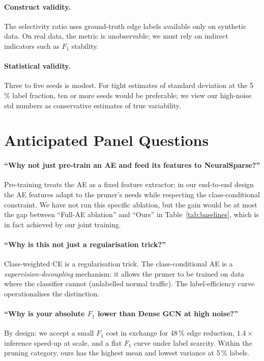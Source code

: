 \documentclass[11pt,a4paper]{report}
\theoremstyle{definition}
\theoremstyle{remark}
\begin{document}
\paragraph{Construct validity.}
The selectivity ratio uses ground-truth edge labels available only on
synthetic data. On real data, the metric is unobservable; we must rely
on indirect indicators such as $F_1$ stability.

\paragraph{Statistical validity.}
Three to five seeds is modest. For tight estimates of standard
deviation at the 5\,\% label fraction, ten or more seeds would be
preferable; we view our high-noise std numbers as conservative
estimates of true variability.

\section{Anticipated Panel Questions}

\paragraph{``Why not just pre-train an AE and feed its features to NeuralSparse?''}
Pre-training treats the AE as a fixed feature extractor; in our
end-to-end design the AE features adapt to the pruner's needs while
respecting the class-conditional constraint. We have not run this
specific ablation, but the gain would be at most the gap between
``Full-AE ablation'' and ``Ours'' in Table~\ref{tab:baselines}, which
is in fact achieved by our joint training.

\paragraph{``Why is this not just a regularisation trick?''}
Class-weighted CE is a regularisation trick. The class-conditional AE
is a \emph{supervision-decoupling} mechanism: it allows the pruner to
be trained on data where the classifier cannot (unlabelled normal
traffic). The label-efficiency curve operationalises the distinction.

\paragraph{``Why is your absolute $F_1$ lower than Dense GCN at high noise?''}
By design: we accept a small $F_1$ cost in exchange for 48\,\% edge
reduction, $1.4\times$ inference speed-up at scale, and a flat $F_1$
curve under label scarcity. Within the pruning category, ours has the
highest mean and lowest variance at 5\,\% labels.
\end{document}
